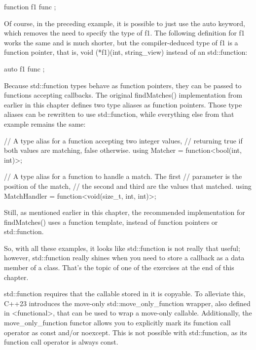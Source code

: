 \begin{cpp}
function f1 { func };
\end{cpp}

Of course, in the preceding example, it is possible to just use the auto keyword, which removes the need to specify the type of f1. The following definition for f1 works the same and is much shorter, but the compiler-deduced type of f1 is a function pointer, that is, void (*f1)(int, string\_view) instead of an std::function:

\begin{cpp}
auto f1 { func };
\end{cpp}

Because std::function types behave as function pointers, they can be passed to functions accepting callbacks. The original findMatches() implementation from earlier in this chapter defines two type aliases as function pointers. Those type aliases can be rewritten to use std::function, while everything else from that example remains the same:

\begin{cpp}
// A type alias for a function accepting two integer values,
// returning true if both values are matching, false otherwise.
using Matcher = function<bool(int, int)>;

// A type alias for a function to handle a match. The first
// parameter is the position of the match,
// the second and third are the values that matched.
using MatchHandler = function<void(size_t, int, int)>;
\end{cpp}

Still, as mentioned earlier in this chapter, the recommended implementation for findMatches() uses a function template, instead of function pointers or std::function.

So, with all these examples, it looks like std::function is not really that useful; however, std::function really shines when you need to store a callback as a data member of a class. That’s the topic of one of the exercises at the end of this chapter.



std::function requires that the callable stored in it is copyable. To alleviate this, C++23 introduces the move-only std::move\_only\_function wrapper, also defined in <functional>, that can be used to wrap a move-only callable. Additionally, the move\_only\_function functor allows you to explicitly mark its function call operator as const and/or noexcept. This is not possible with std::function, as its function call operator is always const.

